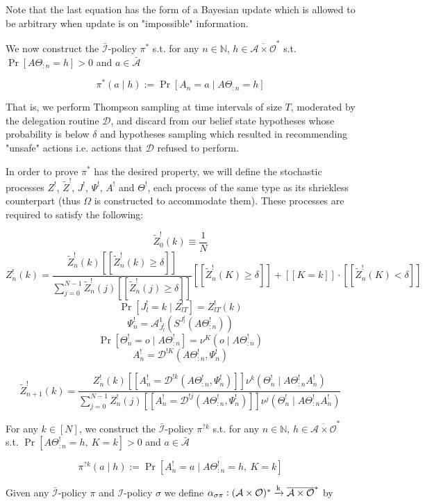 \documentclass[a4paper]{article}
\newcommand{\Nats}{\mathbb{N}}
\newcommand{\M}{\xrightarrow{\textnormal{k}}}
\newcommand{\Ob}{\mathcal{O}}
\newcommand{\A}{\mathcal{A}}
\newcommand{\In}{\mathcal{I}}
\newcommand{\FH}{(\A \times \Ob)^*}
\newcommand{\Ada}{\bar{\A}}
\newcommand{\Adi}{{\bar{\In}}}
\newcommand{\Adao}{\overline{\A \times \Ob}}
\newcommand{\Adfh}{\Adao^*}
\newcommand{\D}{\mathcal{D}}
\newcommand{\Z}{Z}
\newcommand{\J}{J}
\begin{document}
Note that the last equation has the form of a Bayesian update which is allowed to be arbitrary when update is on "impossible" information.

We now construct the $\Adi$-policy $\pi^*$ s.t. for any $n \in \Nats$, $h \in \Adfh$ s.t. $\Pr\left[A\Theta_{:n}=h\right] > 0$ and $a \in \Ada$

$$\pi^*(a \mid h):=\Pr\left[A_n = a \mid A\Theta_{:n} = h\right]$$

That is, we perform Thompson sampling at time intervals of size $T$, moderated by the delegation routine $\D$, and discard from our belief state hypotheses whose probability is below $\delta$ and hypotheses sampling which resulted in recommending "unsafe" actions i.e. actions that $\D$ refused to perform.

In order to prove $\pi^*$ has the desired property, we will define the stochastic processes $\Z^!$, $\tilde{\Z}^!$, $\J^!$, $\Psi^!$, $A^!$ and $\Theta^!$, each process of the same type as its shriekless counterpart (thus $\Omega$ is constructed to accommodate them). These processes are required to satisfy the following:

$$\tilde{\Z}^!_0(k)\equiv\frac{1}{N}$$
%
$$\Z_{n}^!(k) = \frac{\tilde{\Z}^!_{n}(k)[[\tilde{\Z}^!_{n}(k) \geq \delta]] }{\sum_{j = 0}^{N-1}\tilde{\Z}^!_{n}(j)[[\tilde{\Z}^!_{n}(j) \geq \delta]]}[[\tilde{\Z}^!_{n}(K) \geq \delta]] + [[K = k]]\cdot [[\tilde{\Z}^!_{n}(K) < \delta]]$$
%
$$\Pr\left[\J^!_{l} = k \mid Z^!_{lT}\right] = \Z^!_{lT}\left(k\right)$$
%
$$\Psi^!_{n} = \A^1_{\J^!_l}\left(S^{\J^!_l}(A\Theta^!_{:n})\right)$$
%
$$\Pr\left[\Theta^!_{n} = o \mid A\Theta^!_{:n}\right] = \nu^K\left(o \mid A\Theta^!_{:n}\right)$$
%
$$A^!_n = \D^{!K}\left(A\Theta^!_{:n}, \Psi^!_n\right)$$

$$\tilde{\Z}^!_{n+1}(k)=\frac{\Z^!_{n}(k) [[A^!_n = \D^{!k}\left(A\Theta^!_{:n}, \Psi^!_n\right)]] \nu^k\left(\Theta^!_{n} \mid A\Theta^!_{:n}A^!_{n}\right)}{\sum_{j = 0}^{N-1} \Z^!_n(j) [[A^!_n = \D^{!j}\left(A\Theta^!_{:n}, \Psi^!_n\right)]] \nu^j(\Theta^!_n \mid A\Theta^!_{:n}A^!_n)}$$

For any $k \in [N]$, we construct the $\Adi$-policy $\pi^{?k}$ s.t. for any $n \in \Nats$, $h \in \Adfh$ s.t. $\Pr\left[A\Theta^!_{:n}=h,\ K = k\right] > 0$ and $a \in \Ada$

$$\pi^{?k}(a \mid h):=\Pr\left[A^!_n = a \mid A\Theta^!_{:n} = h,\ K = k\right]$$

Given any $\Adi$-policy $\pi$ and $\In$-policy $\sigma$ we define $\alpha_{\sigma\pi}: \FH \M \Adfh$ by
\end{document}
